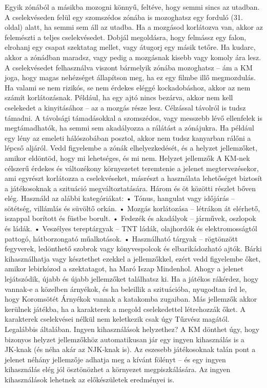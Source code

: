 \documentclass[oneside]{book}
\begin{document}
Egyik zónából a másikba mozogni könnyű, feltéve, hogy semmi sincs az utadban. A cselekvéseden felül egy szomszédos zónába is mozoghatsz egy forduló (31. oldal) alatt, ha semmi sem áll az utadba. Ha a mozgásod korlátozva van, akkor az felemészti a teljes cselekvésedet. Dobjál megoldásra, hogy felmássz egy falon, elrohanj egy csapat szektatag mellet, vagy átugorj egy másik tetőre. Ha kudarc, akkor a zónádban maradsz, vagy pedig a mozgásnak kisebb vagy komoly ára lesz. A cselekvésedet felhasználva viszont bármelyik zónába mozoghatsz – ám a KM joga, hogy magas nehézséget állapítson meg, ha ez egy filmbe illő megmozdulás.
Ha valami se nem rizikós, se nem érdekes eléggé kockadobáshoz, akkor az nem számít korlátozásnak. Például, ha egy ajtó nincs bezárva, akkor nem kell cselekedet a kinyitásához – az a mozgás része lesz.
Célzással távolról is tudsz támadni. A távolsági támadásokkal a szomszédos, vagy messzebb lévő ellenfelek is megtámadhatók, ha semmi sem akadályozza a rálátást a zónájukra. Ha például egy lény az emeleti hálószobában posztol, akkor nem tudsz kanyarban rálőni a lépcső aljáról. Vedd figyelembe a zónák elhelyezkedését, és a helyzet jellemzőket, amikor eldöntöd, hogy mi lehetséges, és mi nem.
Helyzet jellemzők
A KM‑nek célszerű érdekes és változékony környezetet teremtenie a jelenet megtervezésekor, ami egyrészt korlátozza a cselekvéseket, másrészt a használata lehetőséget biztosít a játékosoknak a szituáció megváltoztatására. Három és öt közötti részlet bőven elég. Használd az alábbi kategóriákat:
    • Tónus, hangulat vagy időjárás – sötétség, villámlás és süvöltő orkán.
    • Mozgás korlátozása – létrákon át elérhető, iszappal borított és füstbe borult.
    • Fedezék és akadályok – járművek, oszlopok és ládák.
    • Veszélyes tereptárgyak – TNT ládák, olajhordók és elektromosságtól pattogó, hátborzongató műalkotások.
    • Használható tárgyak – rögtönzött fegyverek, ledönthető szobrok vagy könyvespolcok és elbarikádozható ajtók.
Bárki kihasználhatja vagy késztethet ezekkel a jellemzőkkel, ezért vedd figyelembe őket, amikor lebirkózod a szektatagot, ha Maró Iszap Mindenhol.
Ahogy a jelenet lejátszódik, újabb és újabb jellemzőket találhatsz ki. Ha a játékos rákérdez, hogy vannak‑e a közelben árnyékok, és ha beleillik a szituációba, nyugodtan írd le, hogy Koromsötét Árnyékok vannak a katakomba zugaiban. Más jellemzők akkor kerülnek játékba, ha a karakterek a megold cselekedettel létrehozzák őket. A karakterek cselekvései nélkül nem keletkezik csak úgy Tűzvész magától. Legalábbis általában.
Ingyen kihasználások helyzethez?
A KM dönthet úgy, hogy bizonyos helyzet jellemzőkhöz automatikusan jár egy ingyen kihasználás is a JK‑knak (és néha akár az NJK‑knak is). Az eszesebb játékosoknak talán pont a jelenet néhány jellemzője adhatja meg a kívánt fölényt – és egy ingyen kihasználás elég jól ösztönözhet a környezet megpiszkálására. Az ingyen kihasználások lehetnek az előkészületek eredményei is.
\end{document}
